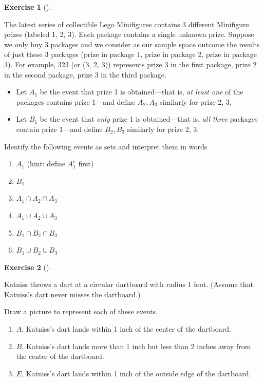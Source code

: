 \documentclass[
  letterpaper,
  DIV=11,
  numbers=noendperiod]{scrreprt}
\providecommand{\tightlist}{%
  \setlength{\itemsep}{0pt}\setlength{\parskip}{0pt}}
\theoremstyle{plain}
\theoremstyle{definition}
\theoremstyle{definition}
\newtheorem{exercise}{Exercise}[chapter]
\theoremstyle{definition}
\theoremstyle{remark}
\begin{document}
\begin{exercise}[]\protect\hypertarget{exr-event-collector3}{}\label{exr-event-collector3}

The latest series of collectible Lego Minifigures contains 3 different
Minifigure prizes (labeled 1, 2, 3). Each package contains a single
unknown prize. Suppose we only buy 3 packages and we consider as our
sample space outcome the results of just these 3 packages (prize in
package 1, prize in package 2, prize in package 3). For example, 323 (or
(3, 2, 3)) represents prize 3 in the first package, prize 2 in the
second package, prize 3 in the third package.

\begin{itemize}
\tightlist
\item
  Let \(A_1\) be the event that prize 1 is obtained---that is, \emph{at
  least one} of the packages contains prize 1---and define \(A_2, A_3\)
  similarly for prize 2, 3.
\item
  Let \(B_1\) be the event that \emph{only} prize 1 is obtained---that
  is, \emph{all three} packages contain prize 1---and define
  \(B_2, B_3\) similarly for prize 2, 3.
\end{itemize}

Identify the following events as sets and interpret them in words

\begin{enumerate}
\def\labelenumi{\arabic{enumi}.}
\tightlist
\item
  \(A_1\) (hint: define \(A_1^c\) first)
\item
  \(B_1\)
\item
  \(A_1 \cap A_2 \cap A_3\)
\item
  \(A_1 \cup A_2 \cup A_3\)
\item
  \(B_1 \cap B_2 \cap B_3\)
\item
  \(B_1 \cup B_2 \cup B_3\)
\end{enumerate}

\end{exercise}

\begin{exercise}[]\protect\hypertarget{exr-event-dartboard}{}\label{exr-event-dartboard}

Katniss throws a dart at a circular dartboard with radius 1 foot.
(Assume that Katniss's dart never misses the dartboard.)

Draw a picture to represent each of these events.

\begin{enumerate}
\def\labelenumi{\arabic{enumi}.}
\tightlist
\item
  \(A\), Katniss's dart lands within 1 inch of the center of the
  dartboard.
\item
  \(B\), Katniss's dart lands more than 1 inch but less than 2 inches
  away from the center of the dartboard.
\item
  \(E\), Katniss's dart lands within 1 inch of the outside edge of the
  dartboard.
\end{enumerate}

\end{exercise}
\end{document}
